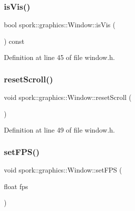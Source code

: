 \subsubsection{\texorpdfstring{is\+Vis()}{isVis()}}
{\footnotesize\ttfamily bool spork\+::graphics\+::\+Window\+::is\+Vis (\begin{DoxyParamCaption}{ }\end{DoxyParamCaption}) const\hspace{0.3cm}{\ttfamily [inline]}}



Definition at line 45 of file window.\+h.

\mbox{\label{classspork_1_1graphics_1_1_window_aab36e127aaad31798d7e4ed5112d42b1}} 
\subsubsection{\texorpdfstring{reset\+Scroll()}{resetScroll()}}
{\footnotesize\ttfamily void spork\+::graphics\+::\+Window\+::reset\+Scroll (\begin{DoxyParamCaption}{ }\end{DoxyParamCaption})\hspace{0.3cm}{\ttfamily [inline]}}



Definition at line 49 of file window.\+h.

\mbox{\label{classspork_1_1graphics_1_1_window_a73fd8ddc91d3dd1c2fe2b25ab44dc69b}} 
\subsubsection{\texorpdfstring{set\+F\+P\+S()}{setFPS()}}
{\footnotesize\ttfamily void spork\+::graphics\+::\+Window\+::set\+F\+PS (\begin{DoxyParamCaption}\item[{float}]{fps }\end{DoxyParamCaption})\hspace{0.3cm}{\ttfamily [inline]}}



